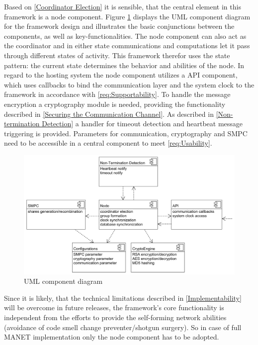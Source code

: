 	Based on \ref{Coordinator Election} it is sensible, that the central element in this framework is a node component. Figure \ref{figure:UML component diagram} displays the \gls{UML} component diagram for the framework design and illustrates the basic conjunctions between the components, as well as key-functionalities. The node component can also act as the coordinator and in either state communications and computations let it pass through different states of activity. This framework therefor uses the state pattern: the current state determines the behavior and abilities of the node.
	In regard to the hosting system the node component utilizes a \gls{API} component, which uses callbacks to bind the communication layer and the system clock to the framework in accordance with \ref{req:Supportability}. To handle the message encryption a cryptography module is needed, providing the functionality described in \ref{Securing the Communication Channel}. As described in \ref{Non-termination Detection} a handler for timeout detection and heartbeat message triggering is provided. Parameters for communication, cryptography and \gls{SMPC} need to be accessible in a central component to meet \ref{req:Usability}.
		
	\begin{figure}[!htbp] %
		\caption{\gls{UML} component diagram} \label{figure:UML component diagram}
		\includegraphics[scale=1.0]{figures/uml-component.png}
	\end{figure}
		
	Since it is likely, that the technical limitations described in \ref{Implementability} will be overcome in future releases, the framework's core functionality is independent from the efforts to provide the self-forming network abilities (avoidance of code smell change preventer/shotgun surgery). So in case of full \gls{MANET} implementation only the node component has to be adopted.
	

\FloatBarrier